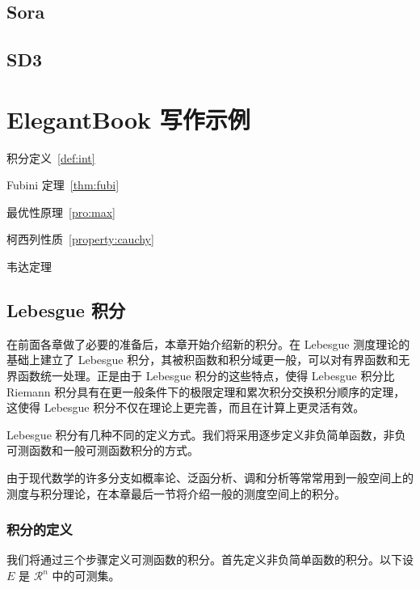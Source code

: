 \documentclass[lang=cn,newtx,10pt,scheme=chinese]{elegantbook}
\begin{document}
\section{Sora}
\section{SD3}





\chapter{ElegantBook 写作示例}

\begin{introduction}
  \item 积分定义~\ref{def:int}
  \item Fubini 定理~\ref{thm:fubi}
  \item 最优性原理~\ref{pro:max}
  \item 柯西列性质~\ref{property:cauchy}
  \item 韦达定理
\end{introduction}

\section{Lebesgue 积分}
在前面各章做了必要的准备后，本章开始介绍新的积分。在 Lebesgue 测度理论的基础上建立了 Lebesgue 积分，其被积函数和积分域更一般，可以对有界函数和无界函数统一处理。正是由于 Lebesgue 积分的这些特点，使得 Lebesgue 积分比 Riemann 积分具有在更一般条件下的极限定理和累次积分交换积分顺序的定理，这使得 Lebesgue 积分不仅在理论上更完善，而且在计算上更灵活有效。

Lebesgue 积分有几种不同的定义方式。我们将采用逐步定义非负简单函数，非负可测函数和一般可测函数积分的方式。

由于现代数学的许多分支如概率论、泛函分析、调和分析等常常用到一般空间上的测度与积分理论，在本章最后一节将介绍一般的测度空间上的积分。

\subsection{积分的定义}

我们将通过三个步骤定义可测函数的积分。首先定义非负简单函数的积分。以下设 $E$ 是 $\mathcal{R}^n$ 中的可测集。
\end{document}
